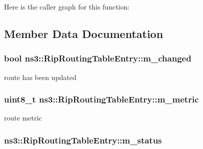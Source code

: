 Here is the caller graph for this function\+:




\subsection{Member Data Documentation}
\subsubsection[{\texorpdfstring{m\+\_\+changed}{m_changed}}]{\setlength{\rightskip}{0pt plus 5cm}bool ns3\+::\+Rip\+Routing\+Table\+Entry\+::m\+\_\+changed\hspace{0.3cm}{\ttfamily [private]}}\hypertarget{classns3_1_1RipRoutingTableEntry_a1e7c17933472ed89d046e3bd50eb7766}{}\label{classns3_1_1RipRoutingTableEntry_a1e7c17933472ed89d046e3bd50eb7766}


route has been updated 

\subsubsection[{\texorpdfstring{m\+\_\+metric}{m_metric}}]{\setlength{\rightskip}{0pt plus 5cm}uint8\+\_\+t ns3\+::\+Rip\+Routing\+Table\+Entry\+::m\+\_\+metric\hspace{0.3cm}{\ttfamily [private]}}\hypertarget{classns3_1_1RipRoutingTableEntry_aab183e8319bb0b85c22a2b1c6ede4d43}{}\label{classns3_1_1RipRoutingTableEntry_aab183e8319bb0b85c22a2b1c6ede4d43}


route metric 

\subsubsection[{\texorpdfstring{m\+\_\+status}{m_status}}]{ ns3\+::\+Rip\+Routing\+Table\+Entry\+::m\+\_\+status\hspace{0.3cm}{\ttfamily [private]}}\hypertarget{classns3_1_1RipRoutingTableEntry_a02a11ffe6a1d36a14919db77ac7825cf}{}\label{classns3_1_1RipRoutingTableEntry_a02a11ffe6a1d36a14919db77ac7825cf}


